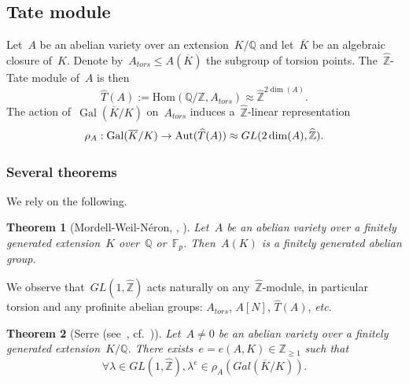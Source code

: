 \documentclass[12pt]{amsart}
\newtheorem{theorem}{Theorem}[section]
\newcommand{\Hom}{\mbox{Hom}}
\newcommand{\Aut}{{\rm Aut}}
\newcommand{\Gal}{{\rm Gal}}
\newcommand{\F}{{\mathbb F}}
\newcommand{\Z}{{\mathbb Z}}
\newcommand{\Q}{{\mathbb Q}}
\renewcommand{\Gal}{{\operatorname{Gal}}}
\newcommand{\ol}{\overline}
\newcommand{\wh}{\widehat}
\begin{document}
\subsection{Tate module}
Let~$A$ be an abelian variety over an extension~$K/\Q$ and let~$\ol{K}$ be an algebraic closure of~$K$. Denote by~$A_{tors}\leq A(\ol{K})$ the subgroup of torsion points.
The~$\wh{\Z}$-Tate module of~$A$ is then
\[
\wh{T}(A):=\Hom(\Q/\Z,A_{tors})\approx\wh{\Z}^{2\dim(A)}.
\]
The action of~$\Gal(\ol{K}/K)$ on~$A_{tors}$ induces a~$\wh{\Z}$-linear representation
\[
\rho_A:\Gal(\ol{K}/K)\to \Aut(\wh{T}(A))\approx GL(2\dim(A),\wh{\Z}).
\]
\subsubsection{Several theorems}We rely on the following.
\begin{theorem}[Mordell-Weil-Néron, {\cite[p. 52 Remark]{Serre:MWT}}, \cite{LN}]\label{thm:MWN}
Let~$A$  be an abelian variety over a finitely generated extension~$K$ over~$\Q$ or~$\F_p$.
Then~$A(K)$ is a finitely generated abelian group.
\end{theorem}

We observe that~$GL(1,\wh{\Z})$ acts naturally on any~$\wh{\Z}$-module, in particular torsion and any profinite abelian groups: $A_{tors}$, $A[N]$, $\wh{T}(A)$, \textit{etc}.

\begin{theorem}[Serre (see~{\cite[33, p.\,34, Th. 2 and 2']{Serre:O4}}, cf.~{\cite[Lemme 12]{Hindry}})]\label{thm:Serre eAK}
Let~$A\neq0$  be an abelian variety over a finitely generated extension~$K/\Q$. 
There exists~$e=e(A,K)\in\Z_{\geq1}$ such that
\begin{equation}
\label{eq:Serre e}
\forall \lambda\in GL(1,\wh{\Z}), \lambda^e\in \rho_A(Gal(\ol{K}/K)).
\end{equation}
\end{theorem}
\end{document}
